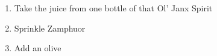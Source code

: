\documentclass{article}
\begin{document}
\begin{enumerate}

	\item{Take the juice from one bottle of
         that Ol' Janx Spirit}
	\item{Sprinkle Zamphuor}
	\item{Add an olive}

\end{enumerate}
\end{document}
